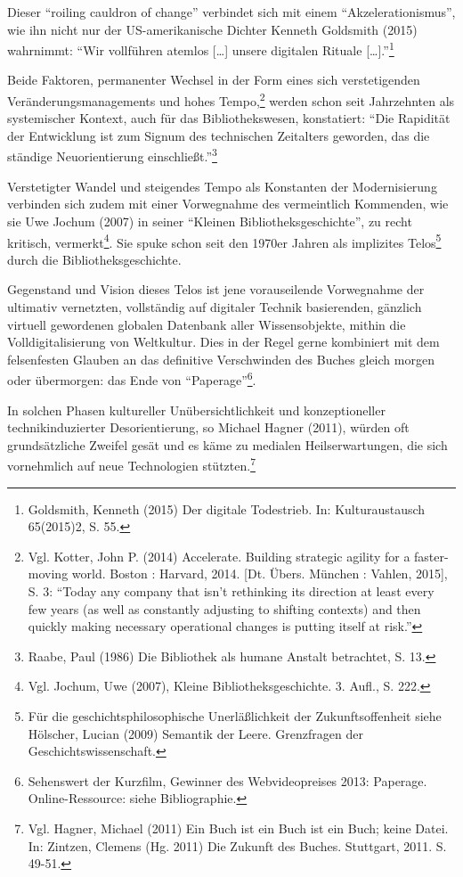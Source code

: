 \documentclass[a4paper,
fontsize=11pt,
oneside,
numbers=noperiodatend,
parskip=half-,
bibliography=totoc,
final
]{scrartcl}
\begin{document}
Dieser \enquote{roiling cauldron of change} verbindet sich mit einem
\enquote{Akzelerationismus}, wie ihn nicht nur der US-amerikanische
Dichter Kenneth Goldsmith (2015) wahrnimmt: \enquote{Wir vollführen
atemlos {[}\ldots{}{]} unsere digitalen Rituale
{[}\ldots{}{]}.}\footnote{Goldsmith, Kenneth (2015) Der digitale
  Todestrieb. In: Kulturaustausch 65(2015)2, S. 55.}

Beide Faktoren, permanenter Wechsel in der Form eines sich
verstetigenden Veränderungsmanagements und hohes Tempo,\footnote{Vgl.
  Kotter, John P. (2014) Accelerate. Building strategic agility for a
  faster-moving world. Boston : Harvard, 2014. {[}Dt. Übers. München :
  Vahlen, 2015{]}, S. 3: \enquote{Today any company that isn't
  rethinking its direction at least every few years (as well as
  constantly adjusting to shifting contexts) and then quickly making
  necessary operational changes is putting itself at risk.}} werden
schon seit Jahrzehnten als systemischer Kontext, auch für das
Bibliothekswesen, konstatiert: \enquote{Die Rapidität der Entwicklung
ist zum Signum des technischen Zeitalters geworden, das die ständige
Neuorientierung einschließt.}\footnote{Raabe, Paul (1986) Die Bibliothek
  als humane Anstalt betrachtet, S. 13.}

Verstetigter Wandel und steigendes Tempo als Konstanten der
Modernisierung verbinden sich zudem mit einer Vorwegnahme des
vermeintlich Kommenden, wie sie Uwe Jochum (2007) in seiner
\enquote{Kleinen Bibliotheksgeschichte}, zu recht kritisch,
vermerkt\footnote{Vgl. Jochum, Uwe (2007), Kleine Bibliotheksgeschichte.
  3. Aufl., S. 222.}. Sie spuke schon seit den 1970er Jahren als
implizites Telos\footnote{Für die geschichtsphilosophische
  Unerläßlichkeit der Zukunftsoffenheit siehe Hölscher, Lucian (2009)
  Semantik der Leere. Grenzfragen der Geschichtswissenschaft.} durch die
Bibliotheksgeschichte.

Gegenstand und Vision dieses Telos ist jene vorauseilende Vorwegnahme
der ultimativ vernetzten, vollständig auf digitaler Technik basierenden,
gänzlich virtuell gewordenen globalen Datenbank aller Wissensobjekte,
mithin die Volldigitalisierung von Weltkultur. Dies in der Regel gerne
kombiniert mit dem felsenfesten Glauben an das definitive Verschwinden
des Buches gleich morgen oder übermorgen: das Ende von
\enquote{Paperage}\footnote{Sehenswert der Kurzfilm, Gewinner des
  Webvideopreises 2013: Paperage. Online-Ressource: siehe Bibliographie.}.

In solchen Phasen kultureller Unübersichtlichkeit und konzeptioneller
technikinduzierter Desorientierung, so Michael Hagner (2011), würden oft
grundsätzliche Zweifel gesät und es käme zu medialen Heilserwartungen,
die sich vornehmlich auf neue Technologien stützten.\footnote{Vgl.
  Hagner, Michael (2011) Ein Buch ist ein Buch ist ein Buch; keine
  Datei. In: Zintzen, Clemens (Hg. 2011) Die Zukunft des Buches.
  Stuttgart, 2011. S. 49-51.}
\end{document}
